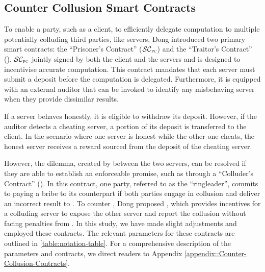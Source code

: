 \vspace{-3mm}

\subsection{Counter Collusion Smart Contracts}\label{Counter-Collusion-Smart-Contracts}
\vspace{-.5mm}


To enable a party, such as a client, to efficiently delegate computation to multiple potentially colluding third parties, like servers, Dong   \et \cite{dong2017betrayal}  
introduced two primary smart contracts: the ``Prisoner's Contract'' ($\SCpc$) and the ``Traitor's Contract'' (\SCtc).  
%
$\SCpc$ jointly signed by both the client and the servers and is designed to incentivise accurate computation. This contract mandates that each server must submit a deposit before the computation is delegated. Furthermore, it is equipped with an external auditor that can be invoked to identify any misbehaving server when they provide dissimilar results. 

If a server behaves honestly, it is eligible to withdraw its deposit. However, if the auditor detects a cheating server, a portion of its deposit is transferred to the client. In the scenario where one server is honest while the other one cheats, the honest server receives a reward sourced from the deposit of the cheating server.

However, the dilemma, created by \SCpc between the two servers, can be resolved if they are able to establish an enforceable promise, such as through a ``Colluder's Contract'' (\SCcc). In this contract,  one party, referred to as the ``ringleader'', commits to paying a bribe to its counterpart if both parties engage in collusion and deliver an incorrect result to \SCpc. 
%
To counter \SCcc, Dong   \et proposed \SCtc, which provides incentives for a colluding server to expose the other server and report the collusion without facing penalties from \SCpc. In this study, we have made slight adjustments and employed these contracts. The relevant parameters for these contracts are outlined in \ref{table:notation-table}. For a comprehensive description of the parameters and contracts, we direct readers to Appendix \ref{appendix::Counter-Collusion-Contracts}. 




